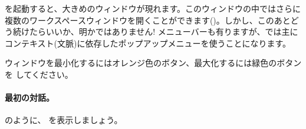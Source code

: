 \documentclass[a4paper,10pt,twoside]{book}
\begin{document}
\pharo を起動すると、大きめのウィンドウが現れます。このウィンドウの中ではさらに複数のワークスペースウィンドウを開くことができます()。しかし、このあとどう続けたらいいか、明かではありません!
メニューバーも有りますが、\pharo では主にコンテキスト(文脈)に依存したポップアップメニューを使うことになります。


ウィンドウを最小化するにはオレンジ色のボタン、最大化するには緑色のボタンを \click してください。

\paragraph{最初の対話。}

 のように、 を表示しましょう。


\end{document}
